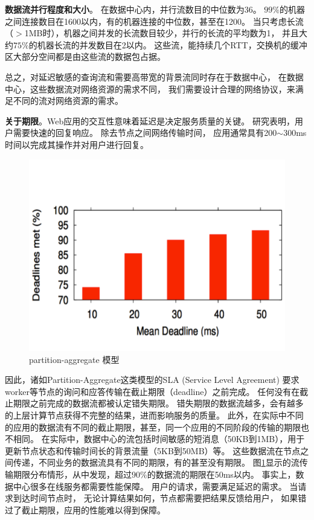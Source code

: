 \textbf{数据流并行程度和大小}。
在数据中心内，并行流数目的中位数为36。
$99\%$的机器之间连接数目在1600以内，有的机器连接的中位数，甚至在1200\cite{DCTCP}。
当只考虑长流（$>$1MB时），机器之间并发的长流数目较少，并行的长流的平均数为1，
并且大约$75\%$的机器长流的并发数目在2以内。
这些流，能持续几个RTT，交换机的缓冲区大部分空间都是由这些流的数据包占据。

总之，对延迟敏感的查询流和需要高带宽的背景流同时存在于数据中心，
在数据中心，这些数据流对网络资源的需求不同，
我们需要设计合理的网络协议，来满足不同的流对网络资源的需求。

\textbf{关于期限}。Web应用的交互性意味着延迟是决定服务质量的关键。
研究表明，用户需要快速的回复响应\cite{kohavi2009controlled}。
除去节点之间网络传输时间，
应用通常具有200$\sim$300ms时间以完成其操作并对用户进行回复\cite{Decandia2007Dynamo}。

\begin{figure}[b]
\begin{center}
\includegraphics [width=0.9\columnwidth] {figures/others/deadline-picture.pdf}
\caption{partition-aggregate 模型}
\label{relatedwork-deadline-fig}
\end{center}
\end{figure}

因此，诸如Partition-Aggregate这类模型的SLA (Service Level Agreement)
要求worker等节点的询问和应答传输在截止期限（deadline）之前完成。
任何没有在截止期限之前完成的数据流都被认定错失期限。
错失期限的数据流越多，会有越多的上层计算节点获得不完整的结果，进而影响服务的质量。
此外，在实际中不同的应用的数据流有不同的截止期限，甚至，同一个应用的不同阶段的传输的期限也不相同。
在实际中，数据中心的流包括时间敏感的短消息（50KB到1MB），用于更新节点状态和传输时间长的背景流量（5KB到50MB）等。
这些数据流在节点之间传递，不同业务的数据流具有不同的期限，有的甚至没有期限。
图\ref{relatedwork-deadline-fig}显示的流传输期限分布情形，从中发现，超过$90\%$的数据流的期限在50ms以内。
事实上，数据中心很多在线服务都需要性能保障\cite{Decandia2007Dynamo,Renesse2002Scalable}。
用户的请求，需要满足延迟的需求。
当请求到达时间节点时，
无论计算结果如何，节点都需要把结果反馈给用户，
如果错过了截止期限，应用的性能难以得到保障。



